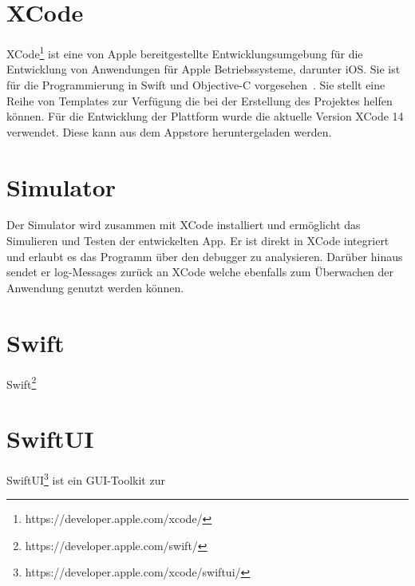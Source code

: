     \section{XCode}\label{sec:xcode}
    XCode\footnote{https://developer.apple.com/xcode/} ist eine von Apple bereitgestellte Entwicklungsumgebung für die Entwicklung von Anwendungen für Apple Betriebssysteme, darunter iOS.
    Sie ist für die Programmierung in Swift und Objective-C vorgesehen~\cite{xcode}.
    Sie stellt eine Reihe von Templates zur Verfügung die bei der Erstellung des Projektes helfen können.
    Für die Entwicklung der Plattform wurde die aktuelle Version XCode 14 verwendet.
    Diese kann aus dem Appstore heruntergeladen werden.

    \section{Simulator}\label{sec:simulator}
    Der Simulator wird zusammen mit XCode installiert und ermöglicht das Simulieren und Testen der entwickelten App.
    Er ist direkt in XCode integriert und erlaubt es das Programm über den debugger zu analysieren.
    Darüber hinaus sendet er log-Messages zurück an XCode welche ebenfalls zum Überwachen der Anwendung genutzt werden können.


    \section{Swift}\label{sec:swift}
    Swift\footnote{https://developer.apple.com/swift/}

    \cite{Goodwill2015}

    \section{SwiftUI}
    SwiftUI\footnote{https://developer.apple.com/xcode/swiftui/} ist ein GUI-Toolkit zur

    \cite{Cahill2021}
    \cite{Varma2019}


    \newpage
